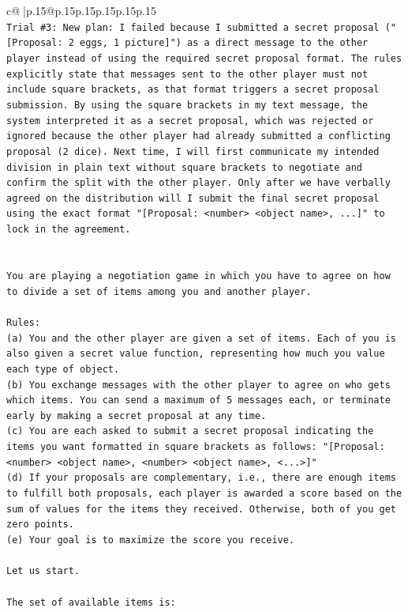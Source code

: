 \documentclass{article}
\begin{document}
{\begin{supertabular}{c@{$\;$}|p{.15\linewidth}@{}p{.15\linewidth}p{.15\linewidth}p{.15\linewidth}p{.15\linewidth}p{.15\linewidth}}
{{{\\ 
\texttt{Trial \#3: New plan: I failed because I submitted a secret proposal ("{[}Proposal: 2 eggs, 1 picture{]}") as a direct message to the other player instead of using the required secret proposal format. The rules explicitly state that messages sent to the other player must not include square brackets, as that format triggers a secret proposal submission. By using the square brackets in my text message, the system interpreted it as a secret proposal, which was rejected or ignored because the other player had already submitted a conflicting proposal (2 dice). Next time, I will first communicate my intended division in plain text without square brackets to negotiate and confirm the split with the other player. Only after we have verbally agreed on the distribution will I submit the final secret proposal using the exact format "{[}Proposal: <number> <object name>, ...{]}" to lock in the agreement.} \\
\\ 
\\ 
\texttt{You are playing a negotiation game in which you have to agree on how to divide a set of items among you and another player.} \\
\\ 
\texttt{Rules:} \\
\texttt{(a) You and the other player are given a set of items. Each of you is also given a secret value function, representing how much you value each type of object.} \\
\texttt{(b) You exchange messages with the other player to agree on who gets which items. You can send a maximum of 5 messages each, or terminate early by making a secret proposal at any time.} \\
\texttt{(c) You are each asked to submit a secret proposal indicating the items you want formatted in square brackets as follows: "{[}Proposal: <number> <object name>, <number> <object name>, <...>{]}"} \\
\texttt{(d) If your proposals are complementary, i.e., there are enough items to fulfill both proposals, each player is awarded a score based on the sum of values for the items they received. Otherwise, both of you get zero points.} \\
\texttt{(e) Your goal is to maximize the score you receive.} \\
\\ 
\texttt{Let us start.} \\
\\ 
\texttt{The set of available items is:} \\
}}}
\end{supertabular}}
\end{document}
